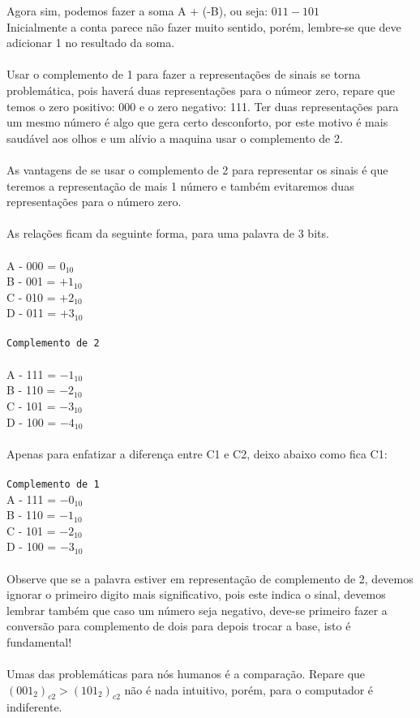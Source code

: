 \documentclass[12pt, onecolumn]{article}
\begin{document}
	Agora sim, podemos fazer a soma A + (-B), ou seja: $011 - 101$\\
	Inicialmente a conta parece não fazer muito sentido, porém, 
	lembre-se que deve adicionar 1 no resultado da soma.\\
	\\	
	Usar o complemento de 1 para fazer a representações de sinais
	se torna problemática, pois haverá duas representações para o
	númeor zero, repare que temos o zero positivo: 000 e o
	zero negativo: 111. Ter duas representações para um mesmo
	número é algo que gera certo desconforto, por este motivo
	é mais saudável aos olhos e um alívio a maquina usar o 
	complemento de 2.\\
	\\
	As vantagens de se usar o complemento de 2 para representar os
	sinais é que teremos a representação de mais 1 número e também
	evitaremos duas representações para o número zero.\\
	\\
	As relações ficam da seguinte forma, para uma palavra de 3 bits.\\
	\\
	A - 000 = $0_{10}$\\
	B - 001 = $+1_{10}$\\
	C - 010 = $+2_{10}$\\
	D - 011 = $+3_{10}$\\
	\\
	\texttt{Complemento de 2}\\
	\\
	A - 111 = $-1_{10}$\\
	B - 110 = $-2_{10}$\\
	C - 101 = $-3_{10}$\\
	D - 100 = $-4_{10}$\\
	\\
	Apenas para enfatizar a diferença entre C1 e C2, deixo
	abaixo como fica C1:\\
	\\
	\texttt{Complemento de 1}\\
	A - 111 = $-0_{10}$\\
	B - 110 = $-1_{10}$\\ 	
	C - 101 = $-2_{10}$\\ 	
	D - 100 = $-3_{10}$\\
	\\
	Observe que se a palavra estiver em representação de 
	complemento de 2, devemos ignorar o primeiro digito
	mais significativo, pois este indica o sinal,
	devemos lembrar também que caso um número seja
	negativo, deve-se primeiro fazer a conversão 
	para complemento de dois para depois trocar a base, 
	isto é fundamental!\\
	\\
	Umas das problemáticas para nós humanos é a comparação.
	Repare que $(001_2)_{c2} > (101_2)_{c2}$ não é nada
	intuitivo, porém, para o computador é indiferente.
	
\end{document}

